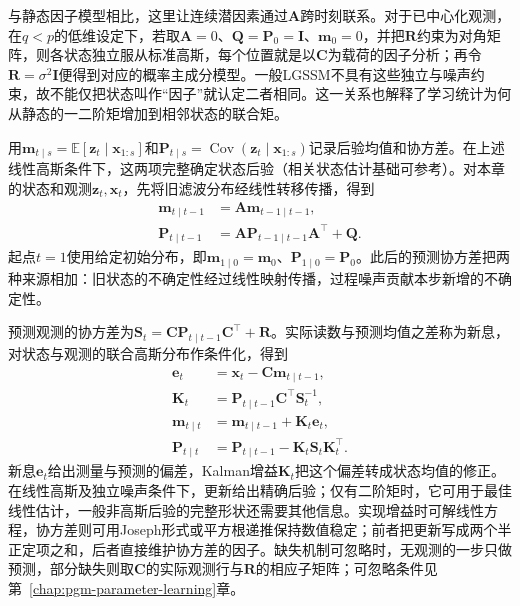 与静态因子模型相比，这里让连续潜因素通过$\bm A$跨时刻联系。对于已中心化观测，在$q<p$的低维设定下，若取$\bm A=0$、$\bm Q=\bm P_0=\bm I$、$\bm m_0=0$，并把$\bm R$约束为对角矩阵，则各状态独立服从标准高斯，每个位置就是以$\bm C$为载荷的因子分析；再令$\bm R=\sigma^2\bm I$便得到对应的概率主成分模型。一般LGSSM不具有这些独立与噪声约束，故不能仅把状态叫作“因子”就认定二者相同。这一关系也解释了学习统计为何从静态的一二阶矩增加到相邻状态的联合矩。

用$\bm{m}_{t\mid s}=\mathbb{E}[\bm{z}_t\mid\bm{x}_{1:s}]$和$\bm{P}_{t\mid s}=\operatorname{Cov}(\bm{z}_t\mid\bm{x}_{1:s})$记录后验均值和协方差。在上述线性高斯条件下，这两项完整确定状态后验（相关状态估计基础可参考）。对本章的状态和观测$\bm z_t,\bm x_t$，先将旧滤波分布经线性转移传播，得到
\begin{equation}
  \begin{aligned}
    \bm{m}_{t\mid t-1}&=\bm{A}\bm{m}_{t-1\mid t-1},\\
    \bm{P}_{t\mid t-1}
      &=\bm{A}\bm{P}_{t-1\mid t-1}\bm{A}^{\top}
        +\bm{Q}.
  \end{aligned}
  \label{eq:pgm-dynamic-kalman-predict}
\end{equation}
起点$t=1$使用给定初始分布，即$\bm{m}_{1\mid0}=\bm{m}_0$、$\bm{P}_{1\mid0}=\bm{P}_0$。此后的预测协方差把两种来源相加：旧状态的不确定性经过线性映射传播，过程噪声贡献本步新增的不确定性。

预测观测的协方差为$\bm S_t=\bm C\bm P_{t\mid t-1}\bm C^\top+\bm R$。实际读数与预测均值之差称为新息，对状态与观测的联合高斯分布作条件化，得到
\begin{equation}
  \begin{aligned}
    \bm{e}_t&=\bm{x}_t-\bm{C}\bm{m}_{t\mid t-1},\\
    \bm{K}_t&=\bm{P}_{t\mid t-1}\bm{C}^{\top}\bm{S}_t^{-1},\\
    \bm{m}_{t\mid t}
      &=\bm{m}_{t\mid t-1}+\bm{K}_t\bm{e}_t,\\
    \bm{P}_{t\mid t}
      &=\bm{P}_{t\mid t-1}
        -\bm{K}_t\bm{S}_t\bm{K}_t^{\top}.
  \end{aligned}
  \label{eq:pgm-dynamic-kalman-update}
\end{equation}
新息$\bm e_t$给出测量与预测的偏差，Kalman增益$\bm K_t$把这个偏差转成状态均值的修正。在线性高斯及独立噪声条件下，更新给出精确后验；仅有二阶矩时，它可用于最佳线性估计，一般非高斯后验的完整形状还需要其他信息。实现增益时可解线性方程，协方差则可用Joseph形式或平方根递推保持数值稳定；前者把更新写成两个半正定项之和，后者直接维护协方差的因子。缺失机制可忽略时，无观测的一步只做预测，部分缺失则取$\bm C$的实际观测行与$\bm R$的相应子矩阵；可忽略条件见第~\ref{chap:pgm-parameter-learning}章。

